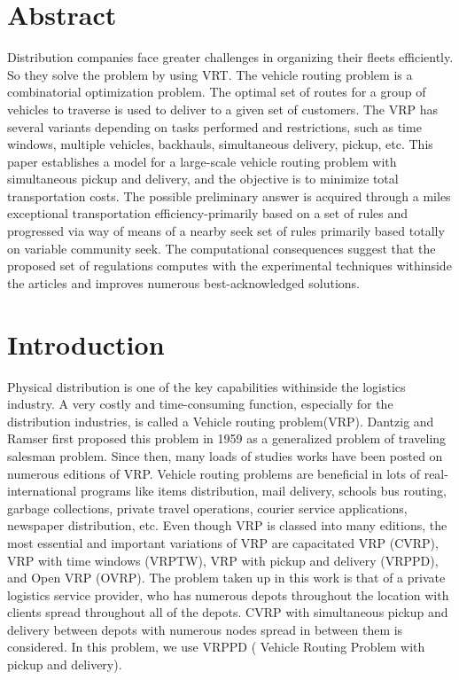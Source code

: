 \documentclass[conference]{IEEEtran}
\begin{document}
{\section{\textbf{Abstract}}}
Distribution companies face greater challenges in organizing their fleets efficiently. So they solve the problem by using VRT. The vehicle routing problem is a combinatorial optimization problem. The optimal set of routes for a group of vehicles to traverse is used to deliver to a given set of customers. The VRP has several variants depending on tasks performed and restrictions, such as time windows, multiple vehicles, backhauls, simultaneous delivery, pickup, etc. This paper establishes a model for a large-scale vehicle routing problem with simultaneous pickup and delivery, and the objective is to minimize total transportation costs. The possible preliminary answer is acquired through a miles exceptional transportation efficiency-primarily based on a set of rules and progressed via way of means of a nearby seek set of rules primarily based totally on variable community seek. The computational consequences suggest that the proposed set of regulations computes with the experimental techniques withinside the articles and improves numerous best-acknowledged solutions. \\


{\section{\textbf{Introduction}}}
Physical distribution is one of the key capabilities withinside the logistics industry. A very costly and time-consuming function, especially for the distribution industries, is called a Vehicle routing problem(VRP). Dantzig and Ramser first proposed this problem in 1959 as a generalized problem of traveling salesman problem. Since then, many loads of studies works have been posted on numerous editions of VRP. Vehicle routing problems are beneficial in lots of real-international programs like items distribution, mail delivery, schools bus routing, garbage collections, private travel operations, courier service applications, newspaper distribution, etc. Even though VRP is classed into many editions, the most essential and important variations of VRP are capacitated VRP (CVRP), VRP with time windows (VRPTW), VRP with pickup and delivery (VRPPD), and
 Open VRP (OVRP). The problem taken up in this work is that of a private logistics service provider, who has numerous depots throughout the location with clients spread throughout all of the depots. CVRP with simultaneous pickup and delivery between depots with numerous nodes spread in between them is considered. In this problem, we use VRPPD ( Vehicle Routing Problem with pickup and delivery).
\\
\end{document}
